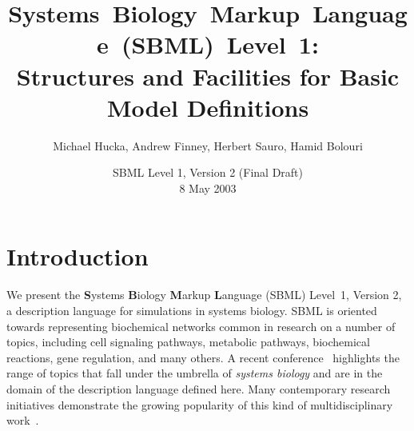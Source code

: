 \documentclass[10pt]{cekarticle}
\newcommand{\changed}[1]{\textcolor{BrickRed}{#1}}
\begin{document}

\title{\mbox{Systems Biology Markup Language (SBML) Level 1:}\\
  Structures and Facilities for Basic Model Definitions}

\author{Michael Hucka, Andrew Finney, Herbert Sauro, Hamid Bolouri}


\address{Systems Biology Workbench Development Group\\
  JST ERATO Kitano Symbiotic Systems Project\\
  Control and Dynamical Systems, MC 107-81\\
  California Institute of Technology, Pasadena, CA 91125, USA\\[3pt]
  \url{http://www.cds.caltech.edu/erato}}



\date{\vspace*{-1ex}SBML Level 1, \changed{Version 2 (Final Draft)}\\[3pt]
  \changed{8 May 2003}\vspace*{-10pt}}

\renewcommand{\baselinestretch}{0.96}
\maketitlepage
\renewcommand{\baselinestretch}{0.98}


\section{Introduction}
\label{sec:introduction}

We present the \textbf{S}ystems \textbf{B}iology \textbf{M}arkup
\textbf{L}anguage (SBML) Level~1\changed{, Version 2}, a description
language for simulations in systems biology.  SBML is oriented towards
representing biochemical networks common in research on a number of topics,
including cell signaling pathways, metabolic pathways, biochemical
reactions, gene regulation, and many others.  A recent
conference~\citep{kitano:2001} highlights the range of topics that fall
under the umbrella of \emph{systems biology} and are in the domain of the
description language defined here.  Many contemporary research initiatives
demonstrate the growing popularity of this kind of multidisciplinary
work~\cite[e.g.,][]{abbott:1999,gilman:2000,popel:1998,smaglik:2000,smaglik:2000b}.
\end{document}
